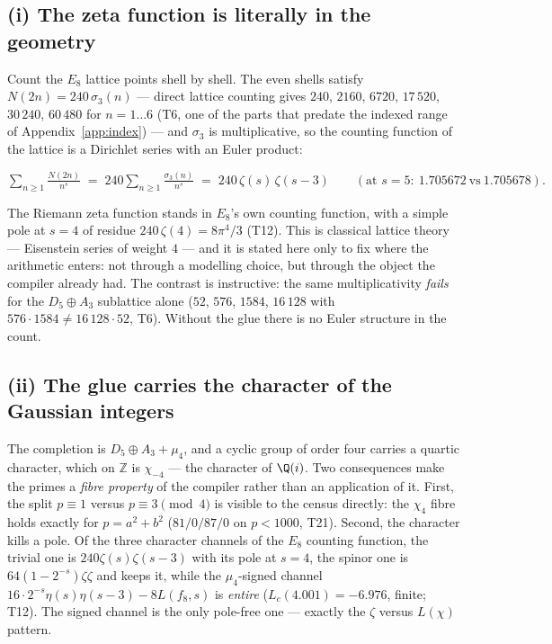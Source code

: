 \documentclass[11pt,a4paper]{article}
\newcommand{\Z}{\mathbb Z}
\begin{document}
\subsection{(i) The zeta function is literally in the geometry}
Count the $E_8$ lattice points shell by shell. The even shells satisfy $N(2n)=240\,\sigma_3(n)$ ---
direct lattice counting gives $240$, $2160$, $6720$, $17\,520$, $30\,240$, $60\,480$ for $n=1\ldots6$
(T6, one of the parts that predate the indexed range of Appendix~\ref{app:index}) --- and $\sigma_3$ is
multiplicative, so the counting function of the lattice is a Dirichlet series
with an Euler product:

\begin{keyeq}$\displaystyle
\sum_{n\ge1}\frac{N(2n)}{n^{s}}\;=\;240\sum_{n\ge1}\frac{\sigma_3(n)}{n^{s}}\;=\;240\,\zeta(s)\,\zeta(s-3)
\qquad(\text{at }s=5:\ 1.705672\ \text{vs}\ 1.705678).$\end{keyeq}

\noindent The Riemann zeta function stands in $E_8$'s own counting function, with a simple pole at
$s=4$ of residue $240\,\zeta(4)=8\pi^4/3$ (T12). This is classical lattice theory --- Eisenstein series
of weight $4$ --- and it is stated here only to fix where the arithmetic enters: not through a modelling
choice, but through the object the compiler already had. The contrast is instructive: the same
multiplicativity \emph{fails} for the $D_5\oplus A_3$ sublattice alone ($52$, $576$, $1584$, $16\,128$
with $576\cdot1584\neq16\,128\cdot52$, T6). Without the glue there is no Euler structure in the count.

\subsection{(ii) The glue carries the character of the Gaussian integers}
The completion is $D_5\oplus A_3+\mu_4$, and a cyclic group of order four carries a quartic character,
which on $\Z$ is $\chi_{-4}$ --- the character of $\Q(i)$. Two consequences make the primes a
\emph{fibre property} of the compiler rather than an application of it. First, the split
$p\equiv1$ versus $p\equiv3\pmod4$ is visible to the census directly: the $\chi_4$ fibre holds exactly
for $p=a^2+b^2$ ($81/0/87/0$ on $p<1000$, T21). Second, the character kills a pole. Of the three
character channels of the $E_8$ counting function, the trivial one is $240\zeta(s)\zeta(s-3)$ with its
pole at $s=4$, the spinor one is $64(1-2^{-s})\zeta\zeta$ and keeps it, while the $\mu_4$-signed channel
$16\cdot2^{-s}\eta(s)\eta(s-3)-8L(f_8,s)$ is \emph{entire} ($L_c(4.001)=-6.976$, finite; T12). The
signed channel is the only pole-free one --- exactly the $\zeta$ versus $L(\chi)$ pattern.
\end{document}

